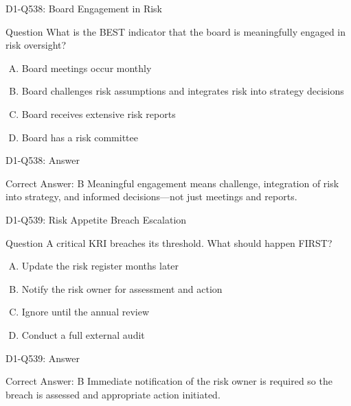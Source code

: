\documentclass{beamer}
\begin{document}
\begin{frame}{D1-Q538: Board Engagement in Risk}
	\begin{block}{Question}
		What is the BEST indicator that the board is meaningfully engaged in risk oversight?
	\end{block}
	\begin{enumerate}[(A)]
		\item Board meetings occur monthly
		\item Board challenges risk assumptions and integrates risk into strategy decisions
		\item Board receives extensive risk reports
		\item Board has a risk committee
	\end{enumerate}
\end{frame}
\begin{frame}{D1-Q538: Answer}
	\begin{block}{Correct Answer: B}
		Meaningful engagement means challenge, integration of risk into strategy, and informed decisions—not just meetings and reports.
	\end{block}
\end{frame}

\begin{frame}{D1-Q539: Risk Appetite Breach Escalation}
	\begin{block}{Question}
		A critical KRI breaches its threshold. What should happen FIRST?
	\end{block}
	\begin{enumerate}[(A)]
		\item Update the risk register months later
		\item Notify the risk owner for assessment and action
		\item Ignore until the annual review
		\item Conduct a full external audit
	\end{enumerate}
\end{frame}
\begin{frame}{D1-Q539: Answer}
	\begin{block}{Correct Answer: B}
		Immediate notification of the risk owner is required so the breach is assessed and appropriate action initiated.
	\end{block}
\end{frame}
\end{document}
